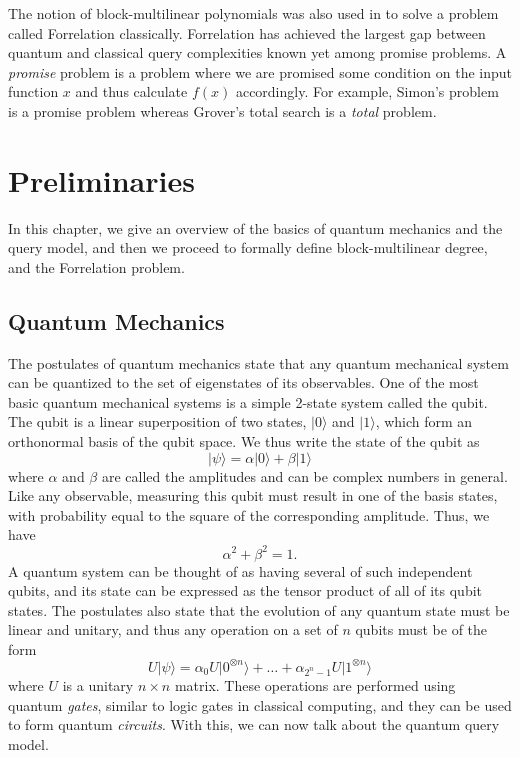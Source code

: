\documentclass[12pt]{report}
\begin{document}
The notion of block-multilinear polynomials was also used in \cite{paper1} to solve a problem called Forrelation classically. Forrelation has achieved the largest gap between quantum and classical query complexities known yet among promise problems. A \textit{promise} problem is a problem where we are promised some condition on the input function $x$ and thus calculate $f(x)$ accordingly. For example, Simon's problem is a promise problem whereas Grover's total search is a \textit{total} problem.



\chapter{Preliminaries}
In this chapter, we give an overview of the basics of quantum mechanics and the query model, and then we proceed to formally define block-multilinear degree, and the Forrelation problem.

\section{Quantum Mechanics}
The postulates of quantum mechanics state that any quantum mechanical system can be quantized to the set of eigenstates of its observables. One of the most basic quantum mechanical systems is a simple 2-state system called the qubit. The qubit is a linear superposition of two states, $|0\rangle$ and $|1\rangle$, which form an orthonormal basis of the qubit space. We thus write the state of the qubit as $$|\psi\rangle = \alpha|0\rangle + \beta|1\rangle$$ where $\alpha$ and $\beta$ are called the amplitudes and can be complex numbers in general. Like any observable, measuring this qubit must result in one of the basis states, with probability equal to the square of the corresponding amplitude. Thus, we have $$\alpha^2 + \beta^2 = 1.$$ A quantum system can be thought of as having several of such independent qubits, and its state can be expressed as the tensor product of all of its qubit states. The postulates also state that the evolution of any quantum state must be linear and unitary, and thus any operation on a set of $n$ qubits must be of the form $$U|\psi\rangle = \alpha_0 U|0^{\otimes n}\rangle + \ldots + \alpha_{2^n-1} U|1^{\otimes n}\rangle$$ where $U$ is a unitary $n \times n$ matrix. These operations are performed using quantum \textit{gates}, similar to logic gates in classical computing, and they can be used to form quantum \textit{circuits}. With this, we can now talk about the quantum query model.
\end{document}
